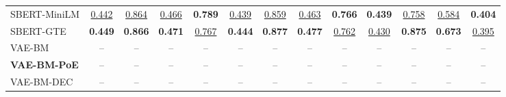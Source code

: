 \begin{table}[t]
{\begin{tabular}{lcccccccccccc}
SBERT-MiniLM & \underline{0.442} & \underline{0.864} & \underline{0.466} & \textbf{0.789} & \underline{0.439} & \underline{0.859} & \underline{0.463} & \textbf{0.766} & \textbf{0.439} & \underline{0.758} & \underline{0.584} & \textbf{0.404} \\
SBERT-GTE & \textbf{0.449} & \textbf{0.866} & \textbf{0.471} & \underline{0.767} & \textbf{0.444} & \textbf{0.877} & \textbf{0.477} & \underline{0.762} & \underline{0.430} & \textbf{0.875} & \textbf{0.673} & \underline{0.395} \\
\midrule
VAE-BM & -- & -- & -- & -- & -- & -- & -- & -- & -- & -- & -- & -- \\
\textbf{VAE-BM-PoE} & -- & -- & -- & -- & -- & -- & -- & -- & -- & -- & -- & -- \\
VAE-BM-DEC & -- & -- & -- & -- & -- & -- & -- & -- & -- & -- & -- & -- \\
\bottomrule
\end{tabular}
}
\end{table}
